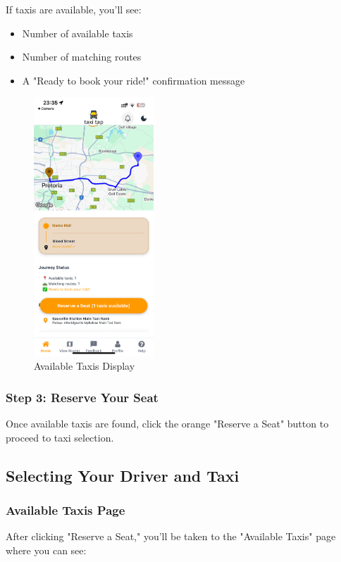 \documentclass[12pt]{article}
\begin{document}
If taxis are available, you'll see:
\begin{itemize}
    \item Number of available taxis
    \item Number of matching routes
    \item A "Ready to book your ride!" confirmation message
\end{itemize}

\begin{figure}[H]
  \centering
  \includegraphics[width=0.4\textwidth]{available_taxis.png}
  \caption{Available Taxis Display}
\end{figure}

\subsubsection{Step 3: Reserve Your Seat}
Once available taxis are found, click the orange "Reserve a Seat" button to proceed to taxi selection.

\subsection{Selecting Your Driver and Taxi}

\subsubsection{Available Taxis Page}
After clicking "Reserve a Seat," you'll be taken to the "Available Taxis" page where you can see:
\end{document}
